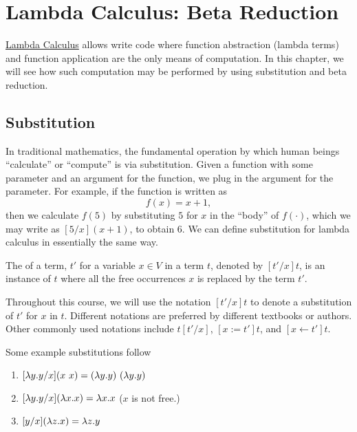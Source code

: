 \chapter{Lambda Calculus: Beta Reduction}
\label{ch:lambda}

\begin{preamble}
\href{ch:lcs}{Lambda Calculus} allows write code where function abstraction (lambda terms) and function application are the only means of computation.
%
In this chapter, we will see how such computation may be performed by using substitution and beta reduction. 
\end{preamble}

\section{Substitution}
\label{sec:lcsb::sub}

In traditional mathematics, the fundamental operation by which human beings ``calculate'' or ``compute'' is via substitution.
%
Given a function with some parameter and an argument for the function, we plug in the argument for the parameter.
%
For example, if the function is written as 
\[
f(x) = x + 1,
\]  
then we calculate $f(5)$ by substituting $5$ for $x$ in the ``body'' of $f(\cdot)$, which we may write as $[5/x](x+1)$, to obtain $6$.
%
We can define substitution for lambda calculus in essentially the same
way.

\begin{definition}[Substitution]
\label{def:lcsb::basic}
The  of a term, $t'$ for a variable $x \in V$ in a term
$t$, denoted by $[t'/x]t$, is an instance of $t$ where all the free
occurrences $x$ is replaced by the term $t'$.
\end{definition}

Throughout this course, we will use the notation $[t'/x]t$ to denote a
substitution of $t'$ for $x$ in $t$.  Different notations are
preferred by different textbooks or authors. Other commonly used
notations include $t[t'/x]$, $[x:=t']t$, and  $[x \leftarrow t']t$.  

\begin{example}
\label{xmpl:lcsb::basic}
Some example substitutions follow
\begin{enumerate}
\item $[\lambda y.y/x] (x~x)= (\lambda y.y)~(\lambda y.y)$

\item $[\lambda y.y/x] (\lambda x.x) = \lambda x.x$ ($x$ is not free.)

\item $[y/x](\lambda z.x) = \lambda z.y$

\end{enumerate}
\end{example}

